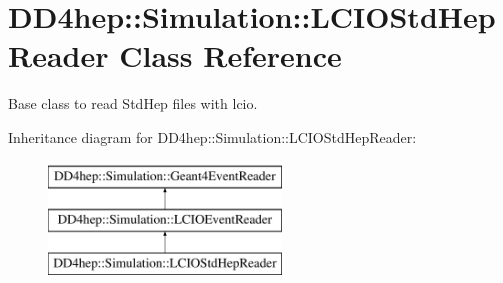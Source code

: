\hypertarget{class_d_d4hep_1_1_simulation_1_1_l_c_i_o_std_hep_reader}{}\section{D\+D4hep\+:\+:Simulation\+:\+:L\+C\+I\+O\+Std\+Hep\+Reader Class Reference}
\label{class_d_d4hep_1_1_simulation_1_1_l_c_i_o_std_hep_reader}


Base class to read Std\+Hep files with lcio.  


Inheritance diagram for D\+D4hep\+:\+:Simulation\+:\+:L\+C\+I\+O\+Std\+Hep\+Reader\+:\begin{figure}[H]
\begin{center}
\leavevmode
\includegraphics[height=3.000000cm]{class_d_d4hep_1_1_simulation_1_1_l_c_i_o_std_hep_reader}
\end{center}
\end{figure}
